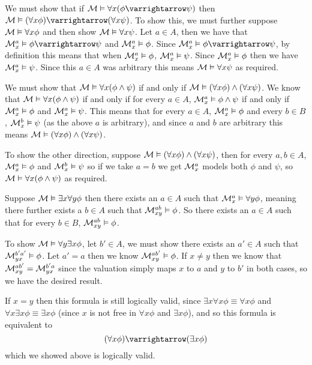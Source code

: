\documentclass[10pt]{article}
\let\to=\varrightarrow
\let\models=\vDash
\def\mM{{\cal M}}
\begin{document}
        \item We must show that if $\mM\models\forall x(\phi\to\psi)$ then $\mM\models(\forall x\phi)\to(\forall x\psi)$.
        To show this, we must further suppose $\mM\models\forall x\phi$ and then show $\mM\models\forall x\psi$.
        Let $a\in A$, then we have that $\mM^a_x\models \phi\to\psi$ and $\mM^a_x\models\phi$.
        Since $\mM^a_x\models\phi\to\psi$, by definition this means that when $\mM^a_x\models\phi$, $\mM^a_x\models\psi$.
        Since $\mM^a_x\models\phi$ then we have $\mM^a_x\models\psi$.
        Since this $a\in A$ was arbitrary this means $\mM\models\forall x\psi$ as required.

        \item We must show that $\mM\models\forall x(\phi\land\psi)$ if and only if $\mM\models(\forall x\phi)\land(\forall x\psi)$.
        We know that $\mM\models\forall x(\phi\land\psi)$ if and only if for every $a\in A$, $\mM^a_x\models\phi\land\psi$ if and only if $\mM^a_x\models\phi$ and $\mM^a_x\models\psi$.
        This means that for every $a\in A$, $\mM^a_x\models\phi$ and every $b\in B$, $\mM^b_x\models\psi$ (as the above $a$ is arbitrary), and since $a$ and $b$ are arbitrary this means
        $\mM\models(\forall x\phi)\land(\forall x\psi)$.

        To show the other direction, suppose $\mM\models(\forall x\phi)\land(\forall x\psi)$, then for every $a,b\in A$, $\mM_x^a\models\phi$ and $\mM^b_x\models\psi$ so if we take $a=b$ we get $\mM^a_x$
        models both $\phi$ and $\psi$,
        so $\mM\models\forall x(\phi\land\psi)$ as required.

        \item Suppose $\mM\models\exists x\forall y\phi$ then there exists an $a\in A$ such that $\mM^a_x\models\forall y\phi$, meaning there further exists a $b\in A$ such that $\mM^{ab}_{xy}\models\phi$.
        So there exists an $a\in A$ such that for every $b\in B$, $\mM^{ab}_{xy}\models\phi$.

        To show $\mM\models\forall y\exists x\phi$, let $b'\in A$, we must show there exists an $a'\in A$ such that $\mM^{b'a'}_{yx}\models\phi$.
        Let $a'=a$ then we know $\mM^{ab'}_{xy}\models\phi$.
        If $x\neq y$ then we know that $\mM^{ab'}_{xy}=\mM^{b'a}_{yx}$ since the valuation simply maps $x$ to $a$ and $y$ to $b'$ in both cases, so we have the desired result.

        If $x=y$ then this formula is still logically valid, since $\exists x\forall x\phi\equiv\forall x\phi$ and $\forall x\exists x\phi\equiv\exists x\phi$ (since $x$ is not free in $\forall x\phi$ and
        $\exists x\phi$), and so this formula is equivalent to
        \[ (\forall x\phi)\to(\exists x\phi) \]
        which we showed above is logically valid.
    \eenum
\end{document}
